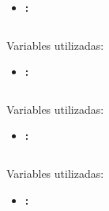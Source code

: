 \begin{itemize}
	\item\code{}\textbf{:}
\end{itemize}
\begin{lstlisting}[language=C]
\end{lstlisting}
Variables utilizadas:

\begin{itemize}
	\item\code{}\textbf{:}
\end{itemize}
\begin{lstlisting}[language=C]
\end{lstlisting}
Variables utilizadas:

\begin{itemize}
	\item\code{}\textbf{:}
\end{itemize}
\begin{lstlisting}[language=C]
\end{lstlisting}
Variables utilizadas:

\begin{itemize}
	\item\code{}\textbf{:}
\end{itemize}
\begin{lstlisting}[language=C]
\end{lstlisting}
